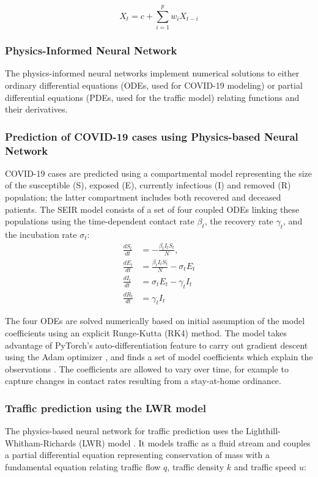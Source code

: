 \documentclass{article}
\begin{document}
\begin{equation}
    X_t=c+\sum_{i=1}^{p} w_iX_{t-i}
\end{equation}

\subsubsection{Physics-Informed Neural Network}

The physics-informed neural networks implement numerical solutions to either ordinary differential equations (ODEs, used for COVID-19 modeling)
or partial differential equations (PDEs, used for the traffic model) relating functions and their derivatives.

\subsubsection{Prediction of COVID-19 cases using Physics-based Neural Network}
COVID-19 cases are predicted using a compartmental model
\cite{zou2020epidemic} representing the size of the susceptible (S), exposed (E), currently infectious (I) and removed (R) population; the latter compartment includes both recovered and deceased patients. The SEIR model consists of a set of four coupled ODEs linking these populations using the time-dependent contact rate $\beta_t$, the recovery rate $\gamma_t$, and the incubation rate $\sigma_t$: 
\begin{align}
\frac{d S_t}{dt} &= - \frac{\beta_t I_t S_t}{N}, \\
\frac{d E_t}{dt} &= \frac{\beta_t I_t S_t}{N} - \sigma_t E_t \\
\frac{d I_t}{dt} &= \sigma_t E_t - \gamma_t I_t \\
\frac{d R_t}{dt} &= \gamma_t I_t
\end{align}

The four ODEs are solved numerically based on initial assumption of the model coefficients using an explicit Runge-Kutta (RK4) method. The model takes advantage of PyTorch’s auto-differentiation feature to carry out gradient descent using the Adam optimizer \cite{kingma2017adam}, and finds a set of model coefficients which explain the observations \cite{wang2020bridging}. The coefficients are allowed to vary over time, for example to capture changes in contact rates resulting from a stay-at-home ordinance. 

\subsubsection{Traffic prediction using the LWR model}
The physics-based neural network for traffic prediction uses the Lighthill-Whitham-Richards (LWR) model \cite{lighthill1955kinematic, richards1956shock}. It models traffic as a fluid stream and couples a partial differential equation representing conservation of mass with a fundamental equation relating traffic flow $q$, traffic density $k$ and 
traffic speed $u$:
\end{document}
